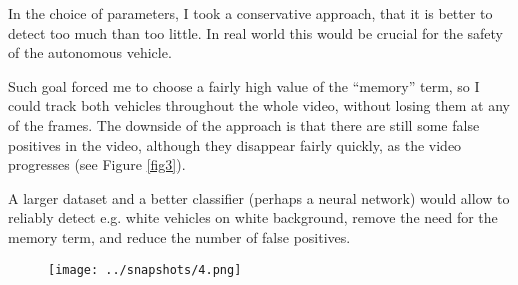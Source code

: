 \documentclass[a4paper,10pt]{article}
\begin{document}
In the choice of parameters, I took a conservative approach, that it is better to detect too much than too little.
In real world this would be crucial for the safety of the autonomous vehicle.

Such goal forced me to choose a fairly high value of the ``memory'' term,
so I could track both vehicles throughout the whole video, without losing them at any of the frames.
The downside of the approach is that there are still some false positives in the video,
although they disappear fairly quickly, as the video progresses (see Figure \ref{fig3}).

A larger dataset and a better classifier (perhaps a neural network) would allow to reliably detect e.g. white vehicles on white background, 
remove the need for the memory term, and reduce the number of false positives.

\begin{figure}[h]
  \begin{center}
    \texttt{[image: ../snapshots/4.png]}
\end{center}
\end{figure}\label{fig3}
\end{document}
